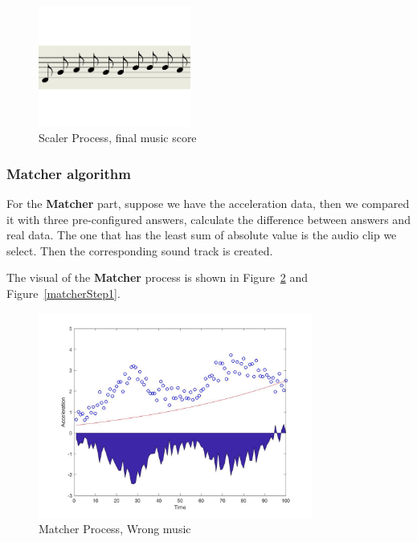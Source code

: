 \begin{figure}[H]
\centering
\newcommand{\widthOfScalerStepFigure}{5cm}
\includegraphics[width=\widthOfScalerStepFigure]{figWR/scaler2}
\caption{Scaler Process, final music score}
\label{scalerStep2}
\end{figure}


\subsubsection{Matcher algorithm}

For the \textbf{Matcher} part, suppose we have the acceleration data, then we
compared it with three pre-configured answers, calculate the difference between
answers and real data. The one that has the least sum of absolute value is the
audio clip we select. Then the corresponding sound track is created. 

The visual of the \textbf{Matcher} process is shown in Figure~\ref{matcherStep0}
and Figure~\ref{matcherStep1}.


\newcommand{\widthOfMatcherFigure}{9cm}

\begin{figure}[H]
\centering
\includegraphics[width=\widthOfMatcherFigure]{figWR/matcher1}
\caption{Matcher Process, Wrong music}
\label{matcherStep0}
\end{figure}

